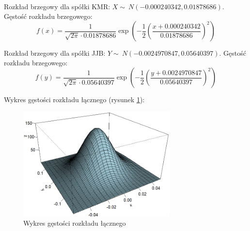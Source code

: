 \documentclass[a4paper,11pt]{article}
\begin{document}
Rozkład brzegowy dla spółki KMR: $ X \sim\ N(-0.000240342, 0.01878686)$.
Gęstość rozkładu brzegowego:
\begin{equation}
    f(x) = \frac{1}{\sqrt{2\pi}\cdot0.01878686} \exp\left(-\frac{1}{2}\left(\frac{x + 0.000240342}{0.01878686}\right)^2\right)
\end{equation}


Rozkład brzegowy dla spółki JJB: $ Y \sim\ N(-0.0024970847,0.05640397)$.
Gęstość rozkładu brzegowego:
\begin{equation}
    f(y) = \frac{1}{\sqrt{2\pi}\cdot0.05640397} \exp\left(-\frac{1}{2}\left(\frac{y + 0.0024970847}{0.05640397}\right)^2\right)
\end{equation}

Wykres gęstości rozkładu łącznego (rysunek \ref{fig:wykres_laczny}):

\begin{figure}[!htb]
	\centering
	\includegraphics[width=8cm]{wykres3d.png}
	\caption{Wykres gęstości rozkładu łącznego }
         \label{fig:wykres_laczny}
\end{figure}
\end{document}
